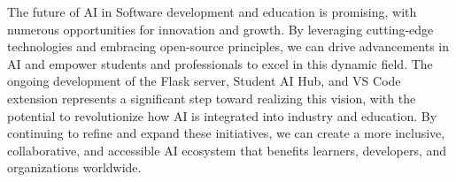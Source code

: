 The future of AI in Software development and education is promising, with numerous opportunities for innovation and growth. 
By leveraging cutting-edge technologies and embracing open-source principles, 
we can drive advancements in AI and empower students and professionals to excel in this dynamic field. The ongoing development of the Flask server, 
Student AI Hub, and VS Code extension represents a significant step toward realizing this vision, 
with the potential to revolutionize how AI is integrated into industry and education. 
By continuing to refine and expand these initiatives, we can create a more inclusive, collaborative, and accessible AI ecosystem that benefits learners, 
developers, and organizations worldwide.